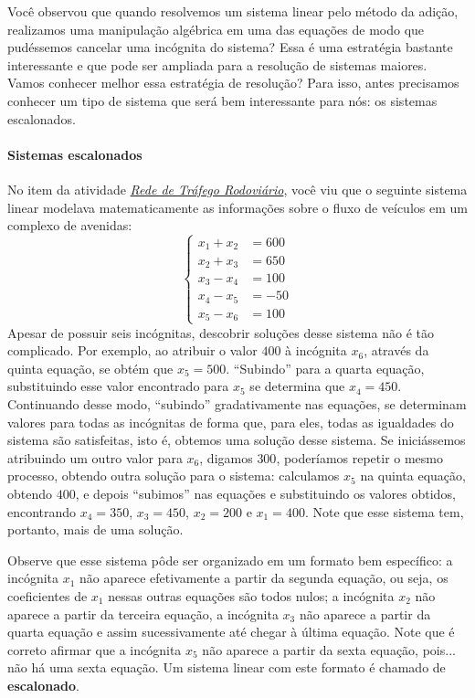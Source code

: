 Você observou que quando resolvemos um sistema linear pelo método da adição, realizamos uma manipulação algébrica em uma das equações de modo que pudéssemos cancelar uma incógnita do sistema? Essa é uma estratégia bastante interessante e que pode ser ampliada para a resolução de sistemas maiores. Vamos conhecer melhor essa estratégia de resolução? Para isso, antes precisamos conhecer um tipo de sistema que será bem interessante para nós: os sistemas escalonados.

\paragraph{Sistemas escalonados}

No item  da atividade \hyperref[trafego]{\textit{Rede de Tráfego Rodoviário}}, você viu que o seguinte sistema linear modelava matematicamente as informações sobre o fluxo de veículos em um complexo de avenidas:
\begin{equation*}
\left\{
\begin{aligned}
x_1+x_2&=600\\
x_2+x_3&=650\\
x_3-x_4&=100\\
x_4-x_5&=-50\\
x_5-x_6&=100
\end{aligned}
\right.
\end{equation*}
Apesar de possuir seis incógnitas, descobrir soluções desse sistema não é tão complicado. Por exemplo, ao atribuir o valor $400$ à incógnita $x_6$, através da quinta equação, se obtém que $x_5=500$. “Subindo”{} para a quarta equação, substituindo esse valor encontrado para $x_5$ se determina que $x_4=450$. Continuando desse modo, “subindo”{} gradativamente nas equações, se determinam valores para todas as incógnitas de forma que, para eles, todas as igualdades do sistema são satisfeitas, isto é, obtemos uma solução desse sistema. Se iniciássemos atribuindo um outro valor para $x_6$, digamos $300$, poderíamos repetir o mesmo processo, obtendo outra solução para o sistema: calculamos $x_5$ na quinta equação, obtendo $400$, e depois “subimos”{} nas equações e substituindo os valores obtidos, encontrando $x_4=350$, $x_3=450$, $x_2=200$ e $x_1=400$. Note que esse sistema tem, portanto, mais de uma solução.

	Observe que esse sistema pôde ser organizado em um formato bem específico: a incógnita $x_1$ não aparece efetivamente a partir da segunda equação, ou seja, os coeficientes de $x_1$ nessas outras equações são todos nulos; a incógnita $x_2$ não aparece a partir da terceira equação, a incógnita $x_3$ não aparece a partir da quarta equação e assim sucessivamente até chegar à última equação. Note que é correto afirmar que a incógnita $x_5$ não aparece a partir da sexta equação, pois... não há uma sexta equação. Um sistema linear com este formato é chamado de \textbf{escalonado}.
	
